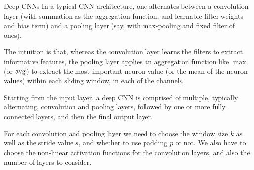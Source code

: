 %
%
%
%
%
%
%
%
%
%
%
\begin{frame}{Deep CNNs}
In a typical CNN architecture, one alternates between a convolution
layer (with summation as the aggregation function, and learnable filter
weights and bias term) and a pooling layer (say, with max-pooling and
    fixed filter of ones). 

\medskip

The intuition is that, whereas the convolution
    layer learns the filters to extract informative features, the pooling
    layer applies an aggregation function like $\max$ (or $\operatorname{avg}$) to
    extract the most important neuron value (or the mean of the neuron
    values) within
    each sliding window, in each of the channels.



\medskip

    Starting from the input layer, 
a deep CNN is comprised of multiple, typically alternating, convolution
and pooling layers, followed by one or more fully connected layers, and
then the final output layer. 

\medskip

For each convolution and pooling layer we need to
choose the window size $k$ as well as the stride value $s$, and whether
to use padding $p$ or not. We also have to choose the non-linear
activation functions for the convolution layers, and also the number of layers to
consider. 
\end{frame}
%
%
